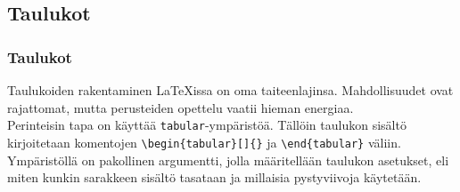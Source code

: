 \documentclass[handout]{beamer}
\theoremstyle{remark}
\newcommand{\vaihto}{\\ \vspace{10pt}}
\begin{document}
\subsection{Taulukot}
\begin{frame}[fragile]
\frametitle{Taulukot}
Taulukoiden rakentaminen \LaTeX issa on oma taiteenlajinsa. Mahdollisuudet ovat rajattomat, mutta perusteiden opettelu vaatii hieman energiaa. 
\vaihto
Perinteisin tapa on käyttää \verb-tabular--ympäristöä. Tällöin taulukon sisältö kirjoitetaan komentojen \verb-\begin{tabular}[]{}- ja \verb-\end{tabular}- väliin.
\vaihto
Ympäristöllä on pakollinen argumentti, jolla määritellään taulukon asetukset, eli miten kunkin sarakkeen sisältö tasataan ja millaisia pystyviivoja käytetään.
\end{frame}

\end{document}
